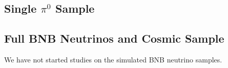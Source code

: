 \subsection{Single $\pi^0$ Sample}
\label{sec:single_pi0}

\subsection{Full BNB Neutrinos and Cosmic Sample}
\label{sec:bnb}

We have not started studies on the simulated BNB neutrino samples.


